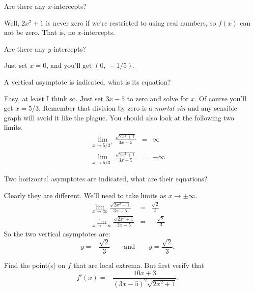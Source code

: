 \documentclass[12pt,addpoints, answers, fleqn]{exam}
\begin{document}
\begin{questions}

\question Are there any $x$-intercepts?

\begin{solution}
Well, $2x^2+1$ is never zero if we're restricted to using real numbers, so $f\left(x \right)$ can not be zero. That is, no $x$-intercepts.
\end{solution}

\question Are there any $y$-intercepts?

\begin{solution}
Just set $x=0$, and you'll get $\left( 0, \ -1/5 \right)$.
\end{solution}

\question A vertical asymptote is indicated, what is its equation?



\begin{solution}
Easy, at least I think so. Just set $3x-5$ to zero and solve for $x$. Of course you'll get $x=5/3$. Remember that division by zero is a \emph{mortal sin} and any sensible graph will avoid it like the plague. You should also look at the following two limits.
\begin{eqnarray*}
\lim_{x \to 5/3^+} \frac{\sqrt{2x^2+1}}{3x-5} &=& \infty\\
\lim_{x \to 5/3^-} \frac{\sqrt{2x^2+1}}{3x-5} &=& -\infty
\end{eqnarray*}

\end{solution}



\question Two horizontal asymptotes are indicated, what are their equations?

\begin{solution}
Clearly they are different. We'll need to take limits as $x \rightarrow \pm \infty$.
\begin{eqnarray*}
\mathop {\lim }\limits_{x \to \infty }  \frac{\sqrt{2x^2+1}}{3x-5} &=& \frac{\sqrt{2}}{3}\\
\mathop {\lim }\limits_{x \to -\infty }  \frac{\sqrt{2x^2+1}}{3x-5} &=& -\frac{\sqrt{2}}{3}
\end{eqnarray*}
So the two vertical asymptotes are:
\[
y = -\frac{\sqrt{2}}{3} \qquad \mbox{and} \qquad y = \frac{\sqrt{2}}{3}.
\]
\end{solution}

\question Find the point(s) on $f$ that are local extrema. But first verify that
\[
f'\left( x \right) = -\frac{10x+3}{\left(3x-5\right)^2\sqrt{2x^2+1}}.
\]


\end{questions}
\end{document}
